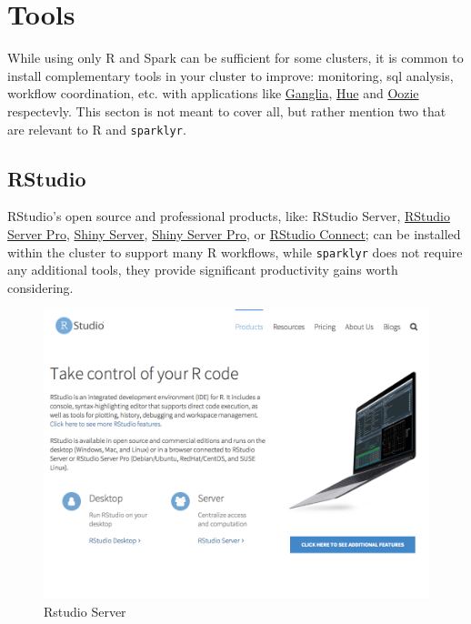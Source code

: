 \documentclass[]{book}
\theoremstyle{definition}
\theoremstyle{definition}
\theoremstyle{definition}
\theoremstyle{remark}
\begin{document}
\hypertarget{tools}{%
\section{Tools}\label{tools}}

While using only R and Spark can be sufficient for some clusters, it is
common to install complementary tools in your cluster to improve:
monitoring, sql analysis, workflow coordination, etc. with applications
like \href{http://ganglia.info/}{Ganglia},
\href{http://gethue.com/}{Hue} and
\href{https://oozie.apache.org}{Oozie} respectevly. This secton is not
meant to cover all, but rather mention two that are relevant to R and
\texttt{sparklyr}.

\hypertarget{rstudio}{%
\subsection{RStudio}\label{rstudio}}

RStudio's open source and professional products, like: RStudio Server,
\href{https://www.rstudio.com/products/rstudio-server-pro/}{RStudio
Server Pro}, \href{https://www.rstudio.com/products/shiny/}{Shiny
Server}, \href{https://www.rstudio.com/products/shiny-server-pro/}{Shiny
Server Pro}, or \href{https://www.rstudio.com/products/connect/}{RStudio
Connect}; can be installed within the cluster to support many R
workflows, while \texttt{sparklyr} does not require any additional
tools, they provide significant productivity gains worth considering.

\begin{figure}

{\centering \includegraphics[width=13.78in]{images/05-clusters-rstudio-server} 

}

\caption{Rstudio Server}\label{fig:rstudio-server}
\end{figure}
\end{document}
